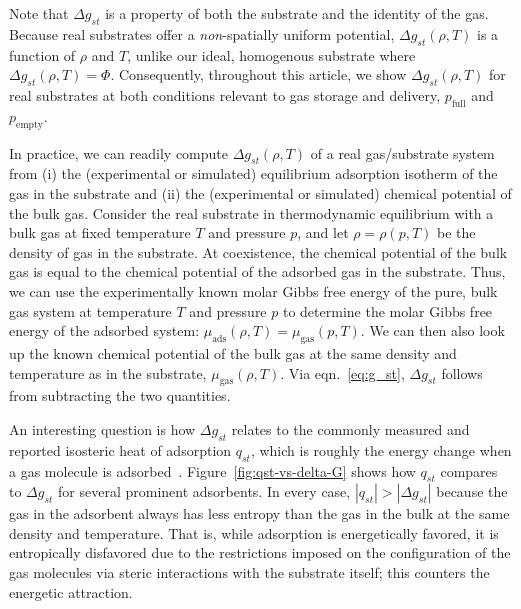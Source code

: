 \documentclass[pre,twocolumn]{revtex4-2}
\newcommand\V{\Phi}
\newcommand\pfull{\ensuremath{p_{\text{full}}}}
\newcommand\pempty{\ensuremath{p_{\text{empty}}}}
\newcommand\gst{\ensuremath{\Delta g_{st}}}
\begin{document}
Note that $\gst$ is a property
of both the substrate and the identity of the gas. Because real substrates
offer a \emph{non}-spatially uniform potential, $\gst(\rho, T)$ is a function
of $\rho$ and $T$, unlike our ideal, homogenous substrate where $\gst(\rho,
T)=\V$. Consequently, throughout this article, we show $\gst(\rho, T)$ for real
substrates at both conditions relevant to gas storage and delivery, $\pfull$
and $\pempty$.

In practice, we can readily compute $\gst(\rho, T)$ of a real gas/substrate
system from (i) the (experimental or simulated) equilibrium adsorption isotherm
of the gas in the substrate and (ii) the (experimental or simulated) chemical
potential of the bulk gas. Consider the real substrate in thermodynamic
equilibrium with a bulk gas at fixed temperature $T$ and pressure $p$, and let
$\rho=\rho(p, T)$ be the density of gas in the substrate. At coexistence, the
chemical potential of the bulk gas is equal to the chemical potential of the
adsorbed gas in the substrate. Thus, we can use the experimentally known molar
Gibbs free energy of the pure, bulk gas system at temperature $T$ and pressure
$p$ to determine the molar Gibbs free energy of the adsorbed system:
$\mu_{\text{ads}}(\rho, T)=\mu_{\text{gas}}(p, T)$. We can then also look up
the known chemical potential of the bulk gas at the same density and
temperature as in the substrate, $\mu_{\text{gas}}(\rho, T)$. Via
eqn.~\ref{eq:g_st}, $\gst$ follows from subtracting the two quantities.

An interesting question is how $\gst$ relates to the commonly measured and
reported isosteric heat of adsorption $q_{st}$, which is roughly the energy
change when a gas molecule is adsorbed~\cite{sircar1999isosteric,
tian2017differential}. Figure~\ref{fig:qst-vs-delta-G} shows how $q_{st}$
compares to $\gst$ for several prominent adsorbents. In every case,
$|q_{st}|>|\gst|$ because the gas in the adsorbent always has less entropy than
the gas in the bulk at the same density and temperature. That is, while
adsorption is energetically favored, it is entropically disfavored due to the
restrictions imposed on the configuration of the gas molecules via steric
interactions with the substrate itself; this counters the energetic attraction.
\end{document}
